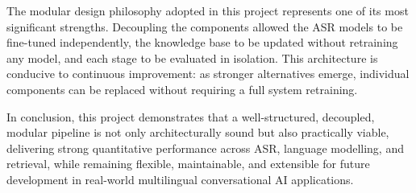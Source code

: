 The modular design philosophy adopted in this project represents one of its most significant strengths. Decoupling the components allowed the ASR models to be fine-tuned independently, the knowledge base to be updated without retraining any model, and each stage to be evaluated in isolation. This architecture is conducive to continuous improvement: as stronger alternatives emerge, individual components can be replaced without requiring a full system retraining.

In conclusion, this project demonstrates that a well-structured, decoupled, modular pipeline is not only architecturally sound but also practically viable, delivering strong quantitative performance across ASR, language modelling, and retrieval, while remaining flexible, maintainable, and extensible for future development in real-world multilingual conversational AI applications.

